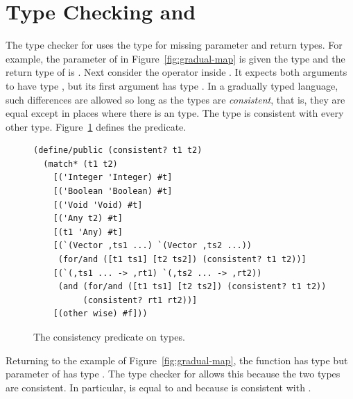 \documentclass[7x10]{TimesAPriori_MIT}%
\begin{document}
\section{Type Checking \LangGrad{} and \LangCast{}}
\label{sec:gradual-type-check}

The type checker for \LangGrad{} uses the  type for missing
parameter and return types. For example, the  parameter of
 in Figure~\ref{fig:gradual-map} is given the type
 and the return type of  is . Next
consider the \code{+} operator inside . It expects both
arguments to have type , but its first argument 
has type .  In a gradually typed language, such differences
are allowed so long as the types are \emph{consistent}, that is, they
are equal except in places where there is an  type. The type
 is consistent with every other type.
Figure~\ref{fig:consistent} defines the  predicate.

\begin{figure}[tbp]
\begin{lstlisting}
(define/public (consistent? t1 t2)
  (match* (t1 t2)
    [('Integer 'Integer) #t]
    [('Boolean 'Boolean) #t]
    [('Void 'Void) #t]
    [('Any t2) #t]
    [(t1 'Any) #t]
    [(`(Vector ,ts1 ...) `(Vector ,ts2 ...))
     (for/and ([t1 ts1] [t2 ts2]) (consistent? t1 t2))]
    [(`(,ts1 ... -> ,rt1) `(,ts2 ... -> ,rt2))
     (and (for/and ([t1 ts1] [t2 ts2]) (consistent? t1 t2))
          (consistent? rt1 rt2))]
    [(other wise) #f]))
\end{lstlisting}
\caption{The consistency predicate on types.}
\label{fig:consistent}
\end{figure}

Returning to the  example of
Figure~\ref{fig:gradual-map}, the  function has type
 but parameter  of  has type
.  The type checker for \LangGrad{} allows this
because the two types are consistent.  In particular, \code{->} is
equal to \code{->} and because  is consistent with
.
\end{document}
